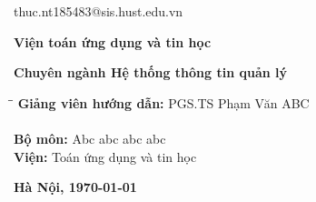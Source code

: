 \begin{titlepage}
\begin{center}
thuc.nt185483@sis.hust.edu.vn
\vspace{0.5cm}

\textbf{{\large Viện toán ứng dụng và tin học}}
\par
\textbf{\large{Chuyên ngành Hệ thống thông tin quản lý}}


\end{center}

\vspace{2cm}
\begin{large}
\begin{tabbing}
\hspace{1.2cm}\= \hspace{6.5cm}\= \kill
\> \textbf{Giảng viên hướng dẫn:} \> PGS.TS Phạm Văn ABC\\
\> \> \\
\> \textbf{Bộ môn:} \> Abc abc abc abc \\
\> \textbf{Viện:} \> Toán ứng dụng và tin học

\end{tabbing}
\end{large}
\vfill
\centering
{\large \textbf{Hà Nội, \today}}




\end{titlepage}